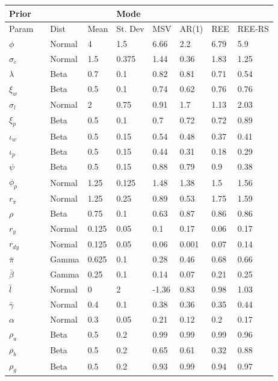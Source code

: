 \documentclass[12pt,reqno]{article}
\numberwithin{equation}{section}
\begin{document}
\begin{table}[H]
\begin{tabular}{l|llll|llll}
 Prior&  &  &  & Mode &  &  &  &  \\
\hline
\hline
Param &  & Dist & Mean & St. Dev & MSV & AR(1) & REE & REE-RS \\
\hline
\hline
$\phi$ &  & Normal & 4 & 1.5 & 6.66 & 2.2 & 6.79 & 5.9 \\
$\sigma_c$ &  & Normal & 1.5 & 0.375 & 1.44 & 0.36 & 1.83 & 1.25 \\
$\lambda$ &  & Beta & 0.7 & 0.1 & 0.82 & 0.81 & 0.71 & 0.54 \\
$\xi_w$ &  & Beta & 0.5 & 0.1 & 0.74 & 0.62 & 0.76 & 0.76 \\
$\sigma_l$ &  & Normal & 2 & 0.75 & 0.91 & 1.7 & 1.13 & 2.03 \\
$\xi_p$ &  & Beta & 0.5 & 0.1 & 0.7 & 0.72 & 0.72 & 0.89 \\
$\iota_w$ &  & Beta & 0.5 & 0.15 & 0.54 & 0.48 & 0.37 & 0.41 \\
$\iota_p$ &  & Beta & 0.5 & 0.15 & 0.44 & 0.31 & 0.18 & 0.29 \\
$\psi$ &  & Beta & 0.5 & 0.15 & 0.88 & 0.79 & 0.9 & 0.38 \\
$\phi_p$ &  & Normal & 1.25 & 0.125 & 1.48 & 1.38 & 1.5 & 1.56 \\
\hline
$r_{\pi}$ &  & Normal & 1.25 & 0.25 & 0.89 & 0.53 & 1.75 & 1.59 \\
$\rho$ &  & Beta & 0.75 & 0.1 & 0.63 & 0.87 & 0.86 & 0.86 \\
$r_y$ &  & Normal & 0.125 & 0.05 & 0.1 & 0.17 & 0.06 & 0.17 \\
$r_{dy}$ &  & Normal & 0.125 & 0.05 & 0.06 & 0.001 & 0.07 & 0.14 \\
\hline
$\bar{\pi}$ &  & Gamma & 0.625 & 0.1 & 0.28 & 0.46 & 0.68 & 0.66 \\
$\bar{\beta}$ &  & Gamma & 0.25 & 0.1 & 0.14 & 0.07 & 0.21 & 0.25 \\
$\bar{l}$ &  & Normal & 0 & 2 & -1.36 & 0.83 & 0.98 & 1.03 \\
$\bar{\gamma}$ &  & Normal & 0.4 & 0.1 & 0.38 & 0.36 & 0.35 & 0.44 \\
$\alpha$ &  & Normal & 0.3 & 0.05 & 0.21 & 0.12 & 0.2 & 0.17 \\
\hline
$\rho_a$ &  & Beta & 0.5 & 0.2 & 0.99 & 0.99 & 0.99 & 0.96 \\
$\rho_b$ &  & Beta & 0.5 & 0.2 & 0.65 & 0.61 & 0.32 & 0.88 \\
$\rho_g$ &  & Beta & 0.5 & 0.2 & 0.93 & 0.99 & 0.94 & 0.97 \\

\end{tabular}
\end{table}
\end{document}

